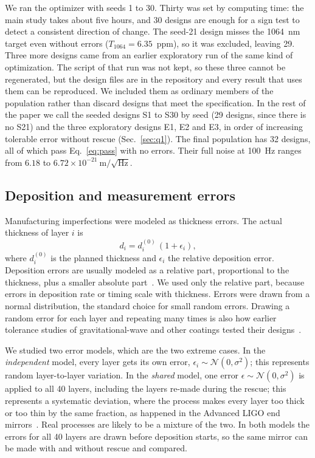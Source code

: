 We ran the optimizer with seeds 1 to 30. Thirty was set by computing time: the main study takes about five hours, and 30 designs are enough for a sign test to detect a consistent direction of change. The seed-21 design misses the 1064~nm target even without errors ($T_{1064} = 6.35$~ppm), so it was excluded, leaving 29. Three more designs came from an earlier exploratory run of the same kind of optimization. The script of that run was not kept, so these three cannot be regenerated, but the design files are in the repository and every result that uses them can be reproduced. We included them as ordinary members of the population rather than discard designs that meet the specification. In the rest of the paper we call the seeded designs S1 to S30 by seed (29 designs, since there is no S21) and the three exploratory designs E1, E2 and E3, in order of increasing tolerable error without rescue (Sec.~\ref{sec:q1}). The final population has 32 designs, all of which pass Eq.~\eqref{eq:pass} with no errors. Their full noise at 100~Hz ranges from $6.18$ to $6.72\times10^{-21}~\mathrm{m}/\sqrt{\mathrm{Hz}}$.

\subsection{Deposition and measurement errors}

Manufacturing imperfections were modeled as thickness errors. The actual thickness of layer $i$ is
\begin{equation}
d_i = d_i^{(0)}\,(1+\epsilon_i),
\end{equation}
where $d_i^{(0)}$ is the planned thickness and $\epsilon_i$ the relative deposition error. Deposition errors are usually modeled as a relative part, proportional to the thickness, plus a smaller absolute part~\cite{Tikhonravov2012}. We used only the relative part, because errors in deposition rate or timing scale with thickness. Errors were drawn from a normal distribution, the standard choice for small random errors. Drawing a random error for each layer and repeating many times is also how earlier tolerance studies of gravitational-wave and other coatings tested their designs~\cite{Venugopalan2024,Pierro2026,Poitras2025}.

We studied two error models, which are the two extreme cases. In the \emph{independent} model, every layer gets its own error, $\epsilon_i \sim \mathcal{N}(0,\sigma^2)$; this represents random layer-to-layer variation. In the \emph{shared} model, one error $\epsilon \sim \mathcal{N}(0,\sigma^2)$ is applied to all 40 layers, including the layers re-made during the rescue; this represents a systematic deviation, where the process makes every layer too thick or too thin by the same fraction, as happened in the Advanced LIGO end mirrors~\cite{aLIGO2015}. Real processes are likely to be a mixture of the two. In both models the errors for all 40 layers are drawn before deposition starts, so the same mirror can be made with and without rescue and compared.

